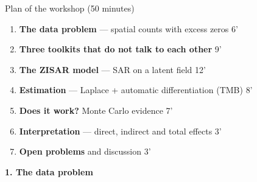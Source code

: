 \documentclass[10pt,aspectratio=169]{beamer}
\newcommand{\sect}[1]{\begin{frame}[plain]\centering\vfill{\usebeamercolor[fg]{title}\LARGE\bfseries #1}\vfill\end{frame}}
\begin{document}
\begin{frame}{Plan of the workshop (50 minutes)}
  \begin{enumerate}\setlength{\itemsep}{0.6em}
    \item \textbf{The data problem} --- spatial counts with excess zeros \hfill {\color{gray}6'}
    \item \textbf{Three toolkits that do not talk to each other} \hfill {\color{gray}9'}
    \item \textbf{The ZISAR model} --- SAR on a latent field \hfill {\color{gray}12'}
    \item \textbf{Estimation} --- Laplace + automatic differentiation (TMB) \hfill {\color{gray}8'}
    \item \textbf{Does it work?} Monte Carlo evidence \hfill {\color{gray}7'}
    \item \textbf{Interpretation} --- direct, indirect and total effects \hfill {\color{gray}3'}
    \item \textbf{Open problems} and discussion \hfill {\color{gray}3'}
  \end{enumerate}
\end{frame}

\sect{1. The data problem}
\end{document}

